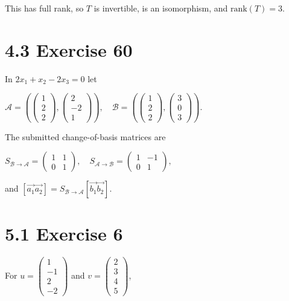 This has full rank, so \(T\) is invertible, is an isomorphism, and \(\text{rank}(T) = 3\).

\section{4.3 Exercise 60}

In \(2x_{1} + x_{2} - 2x_{3} = 0\) let

\(\mathcal{A} = \left( {\begin{pmatrix}
1 \\
2 \\
2
\end{pmatrix},\begin{pmatrix}
2 \\
{- 2} \\
1
\end{pmatrix}} \right),\quad\mathcal{B} = \left( {\begin{pmatrix}
1 \\
2 \\
2
\end{pmatrix},\begin{pmatrix}
3 \\
0 \\
3
\end{pmatrix}} \right).\)

The submitted change-of-basis matrices are

\(S_{\mathcal{B}\rightarrow\mathcal{A}} = \begin{pmatrix}
1 & 1 \\
0 & 1
\end{pmatrix},\quad S_{\mathcal{A}\rightarrow\mathcal{B}} = \begin{pmatrix}
1 & {- 1} \\
0 & 1
\end{pmatrix},\)

and \(\left\lbrack {\overrightarrow{a_{1}}\overrightarrow{a_{2}}} \right\rbrack = S_{\mathcal{B}\rightarrow\mathcal{A}}\left\lbrack {\overrightarrow{b_{1}}\overrightarrow{b_{2}}} \right\rbrack\).

\section{5.1 Exercise 6}

For \(u = \begin{pmatrix}
1 \\
{- 1} \\
2 \\
{- 2}
\end{pmatrix}\) and \(v = \begin{pmatrix}
2 \\
3 \\
4 \\
5
\end{pmatrix}\),

